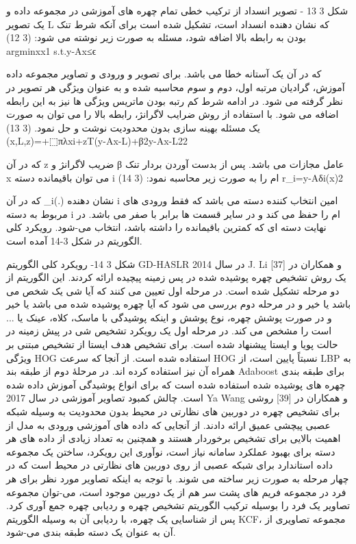 شکل ‏3 13 - تصویر انسداد از ترکیب خطی تمام چهره های آموزشی در مجموعه داده و یک تصویر L که نشان دهنده انسداد است، تشکیل شده است
برای آنکه شرط تنک بودن به رابطه بالا اضافه شود، مسئله به صورت زیر نوشته می شود:
(‏3 12)
argminxx1   s.t.y-Ax≤ϵ

که در آن \epsilon یک آستانه خطا می باشد. برای تصویر و ورودی و تصاویر مجموعه داده آموزش، گرادیان مرتبه اول، دوم و سوم محاسبه شده و به عنوان ویژگی هر تصویر در نظر گرفته می شود. در ادامه شرط کم رتبه بودن ماتریس ویژگی ها نیز به این رابطه اضافه می شود. با استفاده از روش ضرایب لاگرانژ، رابطه بالا را می توان به صورت یک مسئله بهینه سازی بدون محدودیت نوشت و حل نمود.
(‏3 13)	\left(x,L,z\right)=\alphaLM+⬚πλxi+zT(y-Ax-L)+β2y-Ax-L22

که در آن z ضریب لاگرانژ و β عامل مجازات می باشد. پس از بدست آوردن بردار تنک x می توان باقیمانده دسته i ام را به صورت زیر محاسبه نمود:
(‏3 14)
r_i=y-Aδi(x)2

که در آن \delta_i(.) نشان دهنده i امین انتخاب کننده دسته می باشد که فقط ورودی های مربوط به دسته i ام را حفظ می کند و در سایر قسمت ها برابر با صفر می باشد. در نهایت دسته ای که کمترین باقیمانده را داشته باشد، انتخاب می-شود. رویکرد کلی الگوریتم در شکل 3-14 آمده است.
 
شکل ‏3 14- رویکرد کلی الگوریتم GD-HASLR
در سال 2014 J. Li و همکاران در [37] یک روش تشخیص چهره پوشیده شده در پس زمینه پیچیده ارائه کردند. این الگوریتم از دو مرحله تشکیل شده است. در مرحله اول تعیین می کنند که آیا شی یک شخص می باشد یا خیر و در مرحله دوم بررسی می شود که آیا چهره پوشیده شده می باشد یا خیر و در صورت پوشش چهره، نوع پوشش و اینکه پوشیدگی با ماسک، کلاه، عینک یا ... است را مشخص می کند.
در مرحله اول یک رویکرد تشخیص شی در پیش زمینه در حالت پویا و ایستا پیشنهاد شده است. برای تشخیص هدف ایستا از تشخیص مبتنی بر ویژگی HOG استفاده شده است. از آنجا که سرعت HOG نسبتاً پایین است، از LBP به همراه آن نیز استفاده کرده اند. 
در مرحلۀ دوم از طبقه بند Adaboost برای طبقه بندی چهره های پوشیده شده استفاده شده است که برای انواع پوشیدگی آموزش داده شده است.
	چالش کمبود تصاویر آموزشی
در سال 2017 Ya Wang و همکاران در [39] روشی برای تشخیص چهره در دوربین های نظارتی در محیط بدون محدودیت به وسیله شبكه عصبی پیچشی عمیق ارائه دادند. از آنجایی که داده های آموزشی ورودی به مدل از اهمیت بالایی برای تشخیص برخوردار هستند و همچنین به تعداد زیادی از داده های هر دسته برای بهبود عملكرد سامانه نیاز است، نوآوری  این رویکرد، ساختن یک مجموعه داده استاندارد برای شبكه عصبی از روی دوربین های نظارتی در محیط است که در چهار مرحله به صورت زیر ساخته می شوند.
	 با توجه به اینكه تصاویر مورد نظر برای هر فرد در مجموعه فریم های پشت سر هم از یک دوربین موجود است، می-توان مجموعه تصاویر یک فرد را بوسیله ترکیب الگوریتم تشخیص چهره و ردیابی چهره جمع آوری کرد. پس از شناسایی یک چهره، با ردیابی آن به وسیله الگوریتم KCF، مجموعه تصاویری از آن به عنوان یک دسته طبقه بندی می-شود.
 
